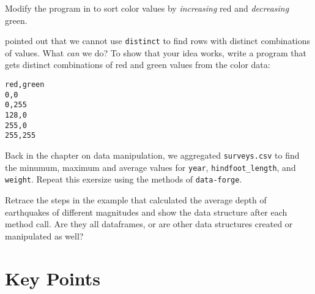 
Modify the program in  to sort color values
by \emph{increasing} red and \emph{decreasing} green.


 pointed out that we cannot use \texttt{distinct}
to find rows with distinct combinations of values.
What \emph{can} we do?
To show that your idea works,
write a program that gets distinct combinations of red and green values from the color data:

\begin{verbatim}
red,green
0,0
0,255
128,0
255,0
255,255
\end{verbatim}


Back in the chapter on data manipulation,
we aggregated \texttt{surveys.csv} to find the minumum, maximum and average values 
for \texttt{year}, \texttt{hindfoot\_length}, and \texttt{weight}.
Repeat this exersize using the methods of \texttt{data-forge}.


Retrace the steps in the example that calculated
the average depth of earthquakes of different magnitudes
and show the data structure after each method call.
Are they all dataframes,
or are other data structures created or manipulated as well?

\section*{Key Points}


